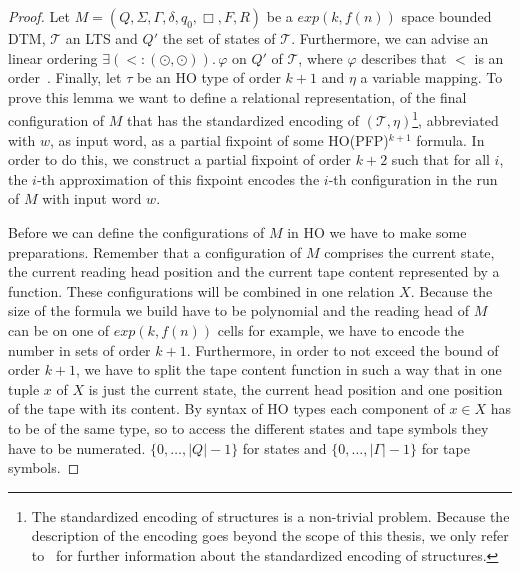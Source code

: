 \begin{proof}
    Let $M = (Q, \Sigma, \Gamma, \delta, q_0, \Box, F, R)$ be a $exp(k, f(n))$ space bounded DTM, $\mathcal{T}$ an LTS and $Q'$ the set of states of $\mathcal{T}$. Furthermore, we can advise an linear ordering $\exists (< \colon (\odot, \odot)).\, \varphi$ on $Q'$ of $\mathcal{T}$, where $\varphi$ describes that $<$ is an order~\cite{fagin1974generalized}. Finally, let $\tau$ be an HO type of
    order $k + 1$ and $\eta$ a variable mapping.
    To prove this lemma we want to define a relational representation, of the final configuration of $M$ that has the standardized encoding of $(\mathcal{T}, \eta)$\footnote{The standardized encoding of structures is a non-trivial problem. Because the description of the encoding goes beyond the scope of this thesis, we only refer to~\cite{abiteboul1995computing} for further information about the standardized encoding of structures.}, abbreviated with $w$, as input word,
    as a partial fixpoint of some HO(PFP)$^{k+1}$ formula. 
    In order to do this, we construct a partial 
fixpoint of order $k+2$ such that for all $i$, the $i$-th approximation of 
this fixpoint encodes the $i$-th configuration in the run of $M$ with 
input word $w$.    

    Before we can define the configurations of $M$ in HO we have to make some preparations. Remember that a
    configuration of $M$ comprises the current state, the current reading head position and
    the current tape content represented by a function. These configurations will be combined in one relation $X$.
    Because the size of the formula we build have to be polynomial and the reading head of $M$ can be on
    one of $exp(k, f(n))$ cells for example, we have to encode the number in sets of order $k + 1$. Furthermore, in order to
    not exceed the bound of order $k + 1$, we have to split the tape content function in such a way that in one tuple
    $x$ of $X$ is just the current state, the current head position and one position of the tape with its content. By
    syntax of HO types each component of $x \in X$ has to be of the same type, so to access the different states and
    tape symbols they have to be numerated. $\{0, \dots, |Q| - 1\}$ for states and $\{0, \dots, |\Gamma| - 1\}$ for tape
    symbols.


\end{proof}
